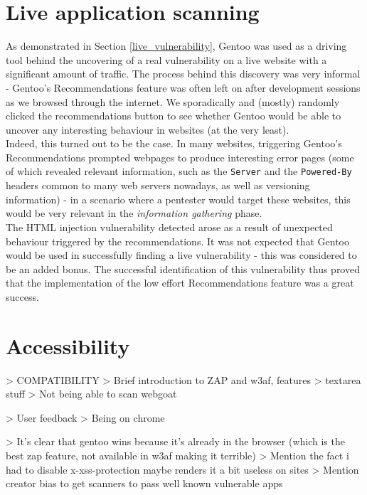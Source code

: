 \section{Live application scanning}

As demonstrated in Section \ref{live_vulnerability}, Gentoo was used as a driving tool behind the uncovering of a real vulnerability on a live website with a significant amount of traffic. The process behind this discovery was very informal - Gentoo's Recommendations feature was often left on after development sessions as we browsed through the internet. We sporadically and (mostly) randomly clicked the recommendations button to see whether Gentoo would be able to uncover any interesting behaviour in websites (at the very least). \\

Indeed, this turned out to be the case. In many websites, triggering Gentoo's Recommendations prompted webpages to produce interesting error pages (some of which revealed relevant information, such as the \texttt{Server} and the \texttt{Powered-By} headers common to many web servers nowadays, as well as versioning information) - in a scenario where a pentester would target these websites, this would be very relevant in the \textit{information gathering} phase. \\

The HTML injection vulnerability detected arose as a result of unexpected behaviour triggered by the recommendations. It was not expected that Gentoo would be used in successfully finding a live vulnerability - this was considered to be an added bonus. The successful identification of this vulnerability thus proved that the implementation of the low effort Recommendations feature was a great success. 



\section{Accessibility}
> COMPATIBILITY 
	> Brief introduction to ZAP and w3af, features
	> textarea stuff	
	> Not being able to scan webgoat


> User feedback
> Being on chrome

> It's clear that gentoo wins because it's already in the browser (which is the best zap feature, not available in w3af making it terrible) 
> Mention the fact i had to disable x-xss-protection maybe renders it a bit useless on sites
> Mention creator bias to get scanners to pass well known vulnerable apps



































